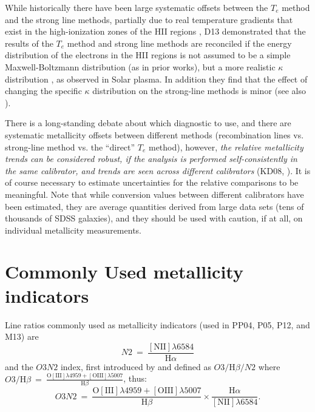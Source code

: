 \documentclass{emulateapj} \usepackage{amsmath} \usepackage{float}
\newcommand{\ha}{\ensuremath{\mathrm{H}\alpha}}
\newcommand{\hb}{\ensuremath{\mathrm{H}\beta}}
\begin{document}
While historically there have been large systematic offsets between
the $T_e$ method and the strong line methods, partially due to
real temperature gradients that exist in the high-ionization zones of
the HII regions \citep{lopezsanchez12}, D13 demonstrated
that the results of the $T_e$ method and strong line
methods are reconciled if the energy distribution of the electrons in the HII
regions is not assumed to be a simple Maxwell-Boltzmann distribution
(as in prior works), but a more realistic $\kappa$
distribution \citep{vasyliunas68, owoki83}, as observed in Solar
plasma. In addition they find that the effect of changing the specific
$\kappa$ distribution on the strong-line methods is minor (see also
\citealt{Mendoza14}).


There is a long-standing debate about which diagnostic to use, and
there are systematic metallicity offsets between different methods
(recombination lines vs. strong-line method vs. the ``direct'' $T_e$
method), however, \emph{the relative metallicity trends can be
  considered robust, if the analysis is performed self-consistently in
  the same calibrator, and trends are seen across different
  calibrators} (KD08, \citealt{moustakas10}). It is of course necessary
to estimate uncertainties for the relative comparisons to be
meaningful. Note that while conversion values between different
calibrators \citep{kewley08} have been estimated, they are average
quantities derived from large data sets (tens of thousands of SDSS
galaxies), and they should be used with caution, if at all, on
individual metallicity measurements. 

\section{Commonly Used metallicity indicators}
Line ratios commonly used as metallicity indicators (used in PP04,
P05, P12, and M13) are $$N2~=~\frac{\mathrm{[NII]}\lambda6584}{\ha}$$
and the $O3N2$ index, first introduced by \citet{alloin79} and defined
as $O3/\hb/N2$ where $O3/\hb~=~
\frac{\mathrm{O[III]}\lambda4959+\mathrm{[OIII]}\lambda5007}{\hb}$,
thus:
$$O3N2~=~\frac{\mathrm{O[III]}\lambda4959+\mathrm{[OIII]}\lambda5007}{\hb}
\times \frac{\ha}{\mathrm{[NII]}\lambda6584}.$$


\end{document}

